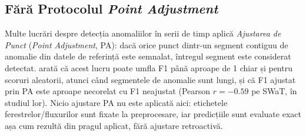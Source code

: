 \subsection{Fără Protocolul \emph{Point Adjustment}}

Multe lucrări despre detecția anomaliilor în serii de timp aplică \emph{Ajustarea de Punct} (\emph{Point Adjustment}, PA): dacă orice punct dintr-un segment contiguu de anomalie din datele de referință este semnalat, întregul segment este considerat detectat. \textcite{kim2022rigorous} arată că acest lucru poate umfla F1 până aproape de 1 chiar și pentru scoruri aleatorii, atunci când segmentele de anomalie sunt lungi, și că F1 ajustat prin PA este aproape necorelat cu F1 neajustat (Pearson $r=-0.59$ pe SWaT, în studiul lor). Nicio ajustare PA nu este aplicată aici: etichetele ferestrelor/fluxurilor sunt fixate la preprocesare, iar predicțiile sunt evaluate exact așa cum rezultă din pragul aplicat, fără ajustare retroactivă.